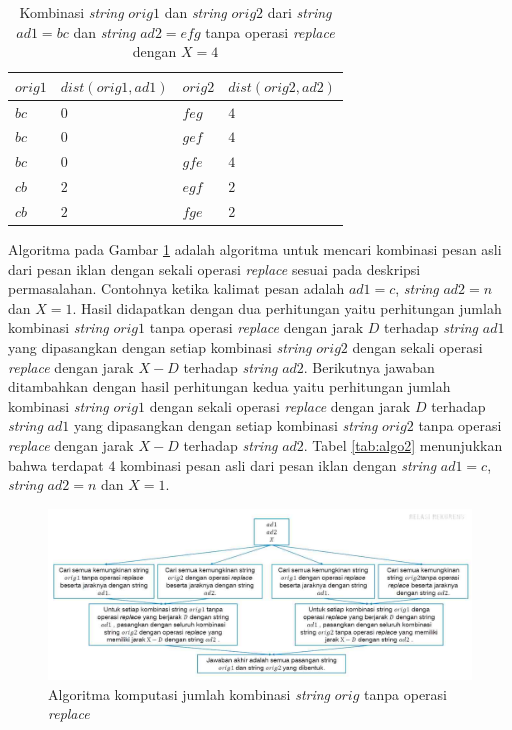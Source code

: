 \documentclass[a4paper]{IEEEtran}
\begin{document}
\begin{table}
	\centering
	\begin{tabular} {|p{1cm}|p{2.5cm}|p{1cm}|p{2.5cm}|} \hline
		$ orig1 $ & $ dist(orig1, ad1) $ & $ orig2 $ & $ dist(orig2, ad2) $ \\ \hline
		$ bc $ & $ 0 $ & $ feg $ & $ 4 $ \\ \hline		
		$ bc $ & $ 0 $ & $ gef $ & $ 4 $ \\ \hline
		$ bc $ & $ 0 $ & $ gfe $ & $ 4 $ \\ \hline
		$ cb $ & $ 2 $ & $ egf $ & $ 2 $ \\ \hline
		$ cb $ & $ 2 $ & $ fge $ & $ 2 $ \\ \hline
	\end{tabular}\caption{Kombinasi \textit{string} $ orig1 $ dan \textit{string} $ orig2 $ dari \textit{string} $ ad1=bc $ dan \textit{string} $ ad2= efg$ tanpa operasi \textit{replace} dengan $ X=4$} 
	\label{tab:algo1}
\end{table}


Algoritma pada Gambar \ref{figure:algo2} adalah algoritma untuk mencari kombinasi pesan asli dari pesan iklan dengan sekali operasi \textit{replace} sesuai pada deskripsi permasalahan. Contohnya ketika kalimat pesan adalah $ ad1=c $, \textit{string} $ ad2=n $ dan $ X=1 $. Hasil didapatkan dengan dua perhitungan yaitu perhitungan jumlah kombinasi \textit{string} $ orig1 $ tanpa operasi \textit{replace} dengan jarak $ D $ terhadap \textit{string} $ ad1 $ yang dipasangkan dengan setiap kombinasi \textit{string} $ orig2 $ dengan sekali operasi \textit{replace} dengan jarak $ X-D $ terhadap \textit{string} $ ad2 $. Berikutnya jawaban ditambahkan dengan hasil perhitungan kedua yaitu perhitungan jumlah kombinasi \textit{string} $ orig1 $ dengan sekali operasi \textit{replace} dengan jarak $ D $ terhadap \textit{string} $ ad1 $ yang dipasangkan dengan setiap kombinasi \textit{string} $ orig2 $ tanpa operasi \textit{replace} dengan jarak $ X-D $ terhadap \textit{string} $ ad2 $. Tabel \ref{tab:algo2} menunjukkan bahwa terdapat $ 4 $ kombinasi pesan asli dari pesan iklan dengan \textit{string} $ ad1=c $, \textit{string} $ ad2=n $ dan $ X=1 $.

\begin{figure}[h]
	\centering
	\includegraphics[width=\linewidth]{images/algo2.jpg}
	\caption{Algoritma komputasi jumlah kombinasi \textit{string} $ orig $ tanpa operasi \textit{replace}}
	\label{figure:algo2}
\end{figure}
\end{document}
